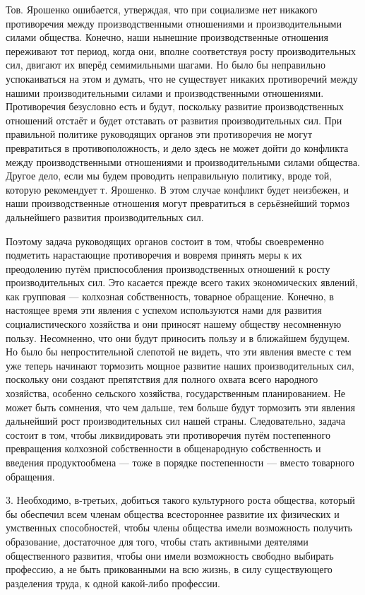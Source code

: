 \documentclass[12pt, a4paper, openany]{book}
\begin{document}
Тов. Ярошенко ошибается, утверждая, что при социализме нет никакого противоречия между производственными отношениями и производительными силами общества. Конечно, наши нынешние производственные отношения переживают тот период, когда они, вполне соответствуя росту производительных сил, двигают их вперёд семимильными шагами. Но было бы неправильно успокаиваться на этом и думать, что не существует никаких противоречий между нашими производительными силами и производственными отношениями. Противоречия безусловно есть и будут, поскольку развитие производственных отношений отстаёт и будет отставать от развития производительных сил. При правильной политике руководящих органов эти противоречия не могут превратиться в противоположность, и дело здесь не может дойти до конфликта между производственными отношениями и производительными силами общества. Другое дело, если мы будем проводить неправильную политику, вроде той, которую рекомендует т. Ярошенко. В этом случае конфликт будет неизбежен, и наши производственные отношения могут превратиться в серьёзнейший тормоз дальнейшего развития производительных сил.

Поэтому задача руководящих органов состоит в том, чтобы своевременно подметить нарастающие противоречия и вовремя принять меры к их преодолению путём приспособления производственных отношений к росту производительных сил. Это касается прежде всего таких экономических явлений, как групповая — колхозная собственность, товарное обращение. Конечно, в настоящее время эти явления с успехом используются нами для развития социалистического хозяйства и они приносят нашему обществу несомненную пользу. Несомненно, что они будут приносить пользу и в ближайшем будущем. Но было бы непростительной слепотой не видеть, что эти явления вместе с тем уже теперь начинают тормозить мощное развитие наших производительных сил, поскольку они создают препятствия для полного охвата всего народного хозяйства, особенно сельского хозяйства, государственным планированием. Не может быть сомнения, что чем дальше, тем больше будут тормозить эти явления дальнейший рост производительных сил нашей страны. Следовательно, задача состоит в том, чтобы ликвидировать эти противоречия путём постепенного превращения колхозной собственности в общенародную собственность и введения продуктообмена — тоже в порядке постепенности — вместо товарного обращения.

3. Необходимо, в-третьих, добиться такого культурного роста общества, который бы обеспечил всем членам общества всестороннее развитие их физических и умственных способностей, чтобы члены общества имели возможность получить образование, достаточное для того, чтобы стать активными деятелями общественного развития, чтобы они имели возможность свободно выбирать профессию, а не быть прикованными на всю жизнь, в силу существующего разделения труда, к одной какой-либо профессии.
\end{document}
